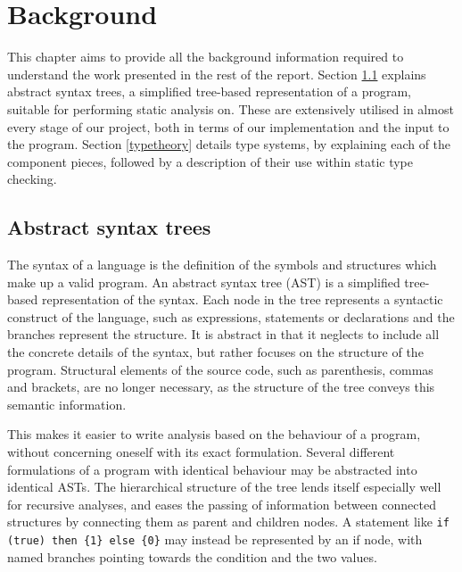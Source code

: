 \documentclass[nofilelist]{cslthse-msc}
\newcommand{\CR}[1]{\textcolor{green!60!black}{[\textbf{CR}:#1]}}
\begin{document}
\chapter{Background}
This chapter aims to provide all the background information required to understand the work presented in the rest of the report.
Section \ref{abstractsyntaxtrees} explains abstract syntax trees, a simplified tree-based representation of a program, suitable for performing static analysis on.
These are extensively utilised in almost every stage of our project, both in terms of our implementation and the input to the program.
Section \ref{typetheory} details type systems, by explaining each of the component pieces, followed by a description of their use within static type checking.

\section{Abstract syntax trees}\label{abstractsyntaxtrees}
The syntax of a language is the definition of the symbols and structures which make up a valid program.
An abstract syntax tree (AST) is a simplified tree-based representation of the syntax.
Each node in the tree represents a syntactic construct of the language, such as expressions, statements or declarations and the branches represent the structure.
It is abstract in that it neglects to include all the concrete details of the syntax, but rather focuses on the structure of the program.
Structural elements of the source code, such as parenthesis, commas and brackets, are no longer necessary, as the structure of the tree conveys this semantic information.

This makes it easier to write analysis based on the behaviour of a program, without concerning oneself with its exact formulation.
Several different formulations of a program with identical behaviour may be abstracted into identical ASTs.
The hierarchical structure of the tree lends itself especially well for recursive analyses, and eases the passing of information between connected structures by connecting them as parent and children nodes.
A statement like \verb|if (true) then {1} else {0}| may instead be represented by an if node, with named branches pointing towards the condition and the two values.
\end{document}

